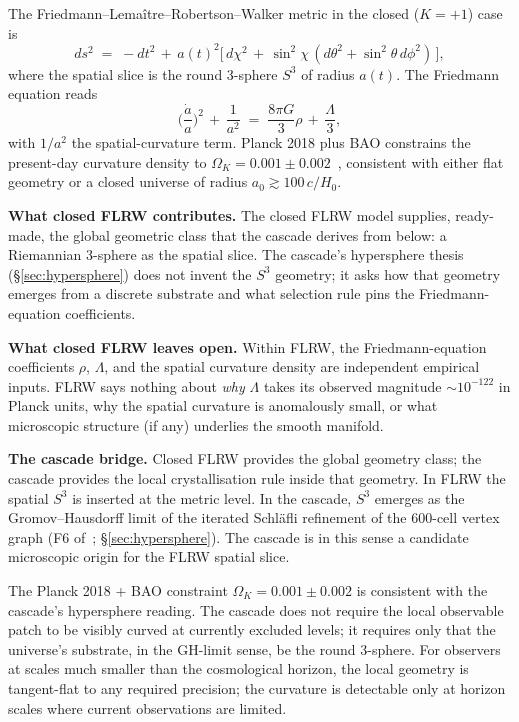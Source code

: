 \documentclass[11pt]{article}
\theoremstyle{plain}
\theoremstyle{definition}
\theoremstyle{remark}
\begin{document}
The Friedmann--Lema\^itre--Robertson--Walker metric in the closed ($K = +1$) case is
\begin{equation}\label{eq:flrw-closed}
  ds^2 \;=\; -dt^2 \,+\, a(t)^2 \Big[\, d\chi^2 \,+\, \sin^2\chi \,(d\theta^2 + \sin^2\theta \,d\phi^2)\,\Big],
\end{equation}
where the spatial slice is the round 3-sphere $S^3$ of radius $a(t)$. The Friedmann equation reads
\begin{equation}\label{eq:friedmann-closed}
  \Big(\frac{\dot a}{a}\Big)^2 \,+\, \frac{1}{a^2} \;=\; \frac{8\pi G}{3} \rho \,+\, \frac{\Lambda}{3},
\end{equation}
with $1/a^2$ the spatial-curvature term. Planck 2018 plus BAO constrains the present-day curvature density to $\Omega_K = 0.001 \pm 0.002$~\citep{Planck2018}, consistent with either flat geometry or a closed universe of radius $a_0 \gtrsim 100 \, c/H_0$.

\medskip
\noindent\textbf{What closed FLRW contributes.} The closed FLRW model supplies, ready-made, the global geometric class that the cascade derives from below: a Riemannian 3-sphere as the spatial slice. The cascade's hypersphere thesis (\S\ref{sec:hypersphere}) does not invent the $S^3$ geometry; it asks how that geometry emerges from a discrete substrate and what selection rule pins the Friedmann-equation coefficients.

\medskip
\noindent\textbf{What closed FLRW leaves open.} Within FLRW, the Friedmann-equation coefficients $\rho$, $\Lambda$, and the spatial curvature density are independent empirical inputs. FLRW says nothing about \emph{why} $\Lambda$ takes its observed magnitude $\sim 10^{-122}$ in Planck units, why the spatial curvature is anomalously small, or what microscopic structure (if any) underlies the smooth manifold.

\medskip
\noindent\textbf{The cascade bridge.} Closed FLRW provides the global geometry class; the cascade provides the local crystallisation rule inside that geometry. In FLRW the spatial $S^3$ is inserted at the metric level. In the cascade, $S^3$ emerges as the Gromov--Hausdorff limit of the iterated Schl\"afli refinement of the 600-cell vertex graph (F6 of~\citealp{SmartXXXVI}; \S\ref{sec:hypersphere}). The cascade is in this sense a candidate microscopic origin for the FLRW spatial slice.

The Planck 2018 + BAO constraint $\Omega_K = 0.001 \pm 0.002$ is consistent with the cascade's hypersphere reading. The cascade does not require the local observable patch to be visibly curved at currently excluded levels; it requires only that the universe's substrate, in the GH-limit sense, be the round 3-sphere. For observers at scales much smaller than the cosmological horizon, the local geometry is tangent-flat to any required precision; the curvature is detectable only at horizon scales where current observations are limited.
\end{document}

